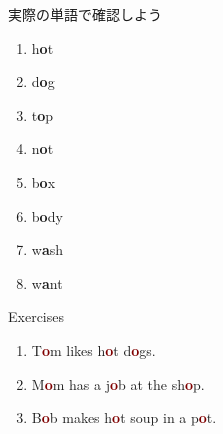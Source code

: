 \documentclass[aspectratio=169,xcolor={dvipsnames,table}]{beamer}
\begin{document}
\begin{frame}[plain]{実際の単語で確認しよう}
\LARGE

\begin{enumerate}
 \item h\textcolor{NavyBlue}{\bfseries o}t%
\hfill{}\hspace{150pt}\mbox{}
 \item d\textcolor{NavyBlue}{\bfseries o}g%
\hfill{}\hspace{150pt}\mbox{} 
\item t\textcolor{NavyBlue}{\bfseries o}p%
\hfill{}\hspace{150pt}\mbox{}
 \item n\textcolor{NavyBlue}{\bfseries o}t%
\hfill{}\hspace{150pt}\mbox{} \item b\textcolor{NavyBlue}{\bfseries o}x%
\hfill{}\hspace{150pt}\mbox{}
 \item b\textcolor{NavyBlue}{\bfseries o}dy%
\hfill{}\hspace{150pt}\mbox{}
 \item w\textcolor{NavyBlue}{\bfseries a}sh%
\hfill{}\hspace{150pt}\mbox{}
 \item w\textcolor{NavyBlue}{\bfseries a}nt%
\hfill{}\hspace{150pt}\mbox{}

\end{enumerate}
\end{frame}
\begin{frame}[plain]{Exercises}
\LARGE

\begin{enumerate}
 \item T\textcolor{Maroon}{\bfseries o}m likes h\textcolor{Maroon}{\bfseries o}t d\textcolor{Maroon}{\bfseries o}gs.
 \item M\textcolor{Maroon}{\bfseries o}m has a j\textcolor{Maroon}{\bfseries o}b  at the sh\textcolor{Maroon}{\bfseries o}p.
 \item B\textcolor{Maroon}{\bfseries o}b makes h\textcolor{Maroon}{\bfseries o}t soup in a p\textcolor{Maroon}{\bfseries o}t.
\end{enumerate}
\end{frame}
\end{document}

